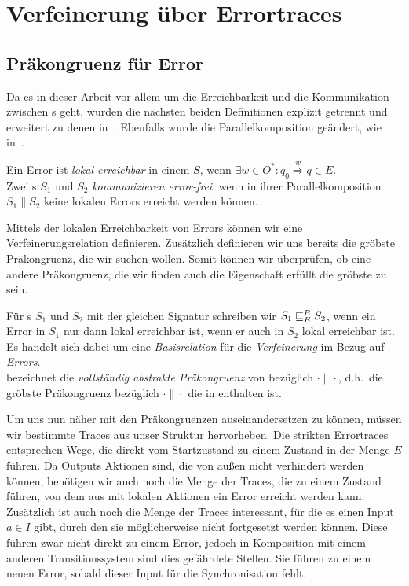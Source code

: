 \chapter{Verfeinerung über Errortraces}

\section{Präkongruenz für Error}

Da es in dieser Arbeit vor allem um die Erreichbarkeit und die Kommunikation
zwischen \EIO{}s geht, wurden die nächsten beiden Definitionen explizit getrennt
und erweitert zu denen in~\cite{Vogler2014EIO}. Ebenfalls wurde die
Parallelkomposition geändert, wie in~\cite{Schlosser2012BA}.

\begin{Def}
  Ein Error ist \emph{lokal erreichbar} in einem \EIO{} $S$, wenn $\exists w\in O^*: q_0
  \overset{w}{\Rightarrow} q\in E$.\\
  Zwei \EIO{}s $S_1$ und $S_2$ \emph{kommunizieren error-frei}, wenn in ihrer
  Parallelkomposition $S_1\| S_2$ keine lokalen Errors erreicht werden können.
\end{Def}

Mittels der lokalen Erreichbarkeit von Errors können wir eine
Verfeinerungsrelation definieren. Zusätzlich definieren wir uns bereits die
gröbste Präkongruenz, die wir suchen wollen. Somit können wir überprüfen, ob
eine andere Präkongruenz, die wir finden auch die Eigenschaft erfüllt die
gröbste zu sein.

\begin{Def}
  Für \EIO{}s $S_1$ und $S_2$ mit der gleichen Signatur schreiben wir
  $S_1\sqsubseteq _E^B S_2$, wenn ein Error in $S_1$ nur dann lokal erreichbar ist, wenn er
  auch in $S_2$ lokal erreichbar ist. Es handelt sich dabei um eine
  \emph{Basisrelation} für die \emph{Verfeinerung} im Bezug auf \emph{Errors}.\\
  \ECRel{} bezeichnet die \emph{vollständig abstrakte Präkongruenz} von \EBRel{}
  bezüglich $\cdot\|\cdot$, d.h.\ die gröbste Präkongruenz bezüglich
  $\cdot\|\cdot$ die in \EBRel{} enthalten ist.
\end{Def}

Um uns nun näher mit den Präkongruenzen auseinandersetzen zu können, müssen wir bestimmte Traces
aus unser Struktur hervorheben. Die strikten Errortraces entsprechen Wege, die
direkt vom Startzustand zu einem Zustand in der Menge $E$ führen. Da Outputs Aktionen
sind, die von außen nicht verhindert werden können, benötigen wir auch noch die
Menge der Traces, die zu einem Zustand führen, von dem aus mit lokalen Aktionen
ein Error erreicht werden kann. Zusätzlich ist auch noch die Menge der Traces
interessant, für die es einen Input $a\in I$ gibt, durch den sie möglicherweise nicht
fortgesetzt werden können. Diese führen zwar nicht
direkt zu einem Error, jedoch in Komposition mit einem anderen
Transitionssystem sind
dies gefährdete Stellen. Sie führen zu einem neuen Error, sobald dieser Input
für die Synchronisation fehlt.

